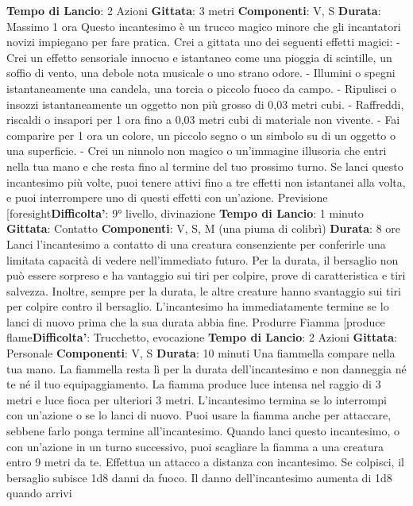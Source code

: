\begin{multicols}{2}
\textbf{Tempo di Lancio}: 2 Azioni
\textbf{Gittata}: 3 metri
\textbf{Componenti}: V, S
\textbf{Durata}: Massimo 1 ora
Questo incantesimo è un trucco magico minore che gli
incantatori novizi impiegano per fare pratica. Crei a
gittata uno dei seguenti effetti magici:
- Crei un effetto sensoriale innocuo e istantaneo
come una pioggia di scintille, un soffio di vento, una
debole nota musicale o uno strano odore.
- Illumini o spegni istantaneamente una candela, una
torcia o piccolo fuoco da campo.
- Ripulisci o insozzi istantaneamente un oggetto non
più grosso di 0,03 metri cubi.
- Raffreddi, riscaldi o insapori per 1 ora fino a 0,03
metri cubi di materiale non vivente.
- Fai comparire per 1 ora un colore, un piccolo segno
o un simbolo su di un oggetto o una superficie.
- Crei un ninnolo non magico o un’immagine illusoria
che entri nella tua mano e che resta fino al termine
del tuo prossimo turno.
Se lanci questo incantesimo più volte, puoi tenere attivi
fino a tre effetti non istantanei alla volta, e puoi
interrompere uno di questi effetti con un’azione.
Previsione
[foresight\textbf{Difficolta'}:
9° livello, divinazione
\textbf{Tempo di Lancio}: 1 minuto
\textbf{Gittata}: Contatto
\textbf{Componenti}: V, S, M (una piuma di colibrì)
\textbf{Durata}: 8 ore
Lanci l’incantesimo a contatto di una creatura
consenziente per conferirle una limitata capacità di
vedere nell’immediato futuro. Per la durata, il bersaglio
non può essere sorpreso e ha vantaggio sui tiri per
colpire, prove di caratteristica e tiri salvezza. Inoltre,
sempre per la durata, le altre creature hanno
svantaggio sui tiri per colpire contro il bersaglio.
L’incantesimo ha immediatamente termine se lo lanci di
nuovo prima che la sua durata abbia fine.
Produrre Fiamma
[produce flame\textbf{Difficolta'}:
Trucchetto, evocazione
\textbf{Tempo di Lancio}: 2 Azioni
\textbf{Gittata}: Personale
\textbf{Componenti}: V, S
\textbf{Durata}: 10 minuti
Una fiammella compare nella tua mano. La fiammella
resta lì per la durata dell’incantesimo e non danneggia
né te né il tuo equipaggiamento. La fiamma produce
luce intensa nel raggio di 3 metri e luce fioca per
ulteriori 3 metri. L’incantesimo termina se lo interrompi
con un’azione o se lo lanci di nuovo.
Puoi usare la fiamma anche per attaccare, sebbene
farlo ponga termine all’incantesimo. Quando lanci
questo incantesimo, o con un’azione in un turno
successivo, puoi scagliare la fiamma a una creatura
entro 9 metri da te. Effettua un attacco a distanza con
incantesimo. Se colpisci, il bersaglio subisce 1d8 danni
da fuoco.
Il danno dell’incantesimo aumenta di 1d8 quando arrivi

\end{multicols}
